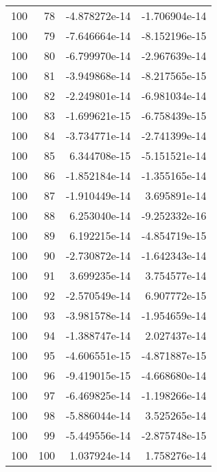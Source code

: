\begin{tabular}{rrrr}
 100 &   78 & -4.878272e-14 & -1.706904e-14 \\
 100 &   79 & -7.646664e-14 & -8.152196e-15 \\
 100 &   80 & -6.799970e-14 & -2.967639e-14 \\
 100 &   81 & -3.949868e-14 & -8.217565e-15 \\
 100 &   82 & -2.249801e-14 & -6.981034e-14 \\
 100 &   83 & -1.699621e-15 & -6.758439e-15 \\
 100 &   84 & -3.734771e-14 & -2.741399e-14 \\
 100 &   85 &  6.344708e-15 & -5.151521e-14 \\
 100 &   86 & -1.852184e-14 & -1.355165e-14 \\
 100 &   87 & -1.910449e-14 &  3.695891e-14 \\
 100 &   88 &  6.253040e-14 & -9.252332e-16 \\
 100 &   89 &  6.192215e-14 & -4.854719e-15 \\
 100 &   90 & -2.730872e-14 & -1.642343e-14 \\
 100 &   91 &  3.699235e-14 &  3.754577e-14 \\
 100 &   92 & -2.570549e-14 &  6.907772e-15 \\
 100 &   93 & -3.981578e-14 & -1.954659e-14 \\
 100 &   94 & -1.388747e-14 &  2.027437e-14 \\
 100 &   95 & -4.606551e-15 & -4.871887e-15 \\
 100 &   96 & -9.419015e-15 & -4.668680e-14 \\
 100 &   97 & -6.469825e-14 & -1.198266e-14 \\
 100 &   98 & -5.886044e-14 &  3.525265e-14 \\
 100 &   99 & -5.449556e-14 & -2.875748e-15 \\
 100 &  100 &  1.037924e-14 &  1.758276e-14 \\
\bottomrule
\end{tabular}
